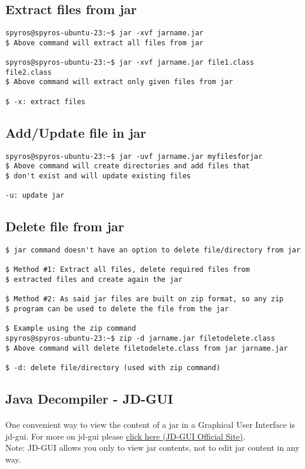 \documentclass{article}
\begin{document}
\subsection{Extract files from jar}
\begin{lstlisting}
spyros@spyros-ubuntu-23:~$ jar -xvf jarname.jar
$ Above command will extract all files from jar

spyros@spyros-ubuntu-23:~$ jar -xvf jarname.jar file1.class file2.class
$ Above command will extract only given files from jar

$ -x: extract files

\end{lstlisting}

\subsection{Add/Update file in jar}
\begin{lstlisting}
spyros@spyros-ubuntu-23:~$ jar -uvf jarname.jar myfilesforjar
$ Above command will create directories and add files that
$ don't exist and will update existing files

-u: update jar
\end{lstlisting}

\subsection{Delete file from jar}
\begin{lstlisting}
$ jar command doesn't have an option to delete file/directory from jar

$ Method #1: Extract all files, delete required files from
$ extracted files and create again the jar

$ Method #2: As said jar files are built on zip format, so any zip
$ program can be used to delete the file from the jar

$ Example using the zip command
spyros@spyros-ubuntu-23:~$ zip -d jarname.jar filetodelete.class
$ Above command will delete filetodelete.class from jar jarname.jar

$ -d: delete file/directory (used with zip command)

\end{lstlisting}

\subsection{Java Decompiler - JD-GUI}
\paragraph{} One convenient way to view the content of a jar in a Graphical User Interface is jd-gui. For more on jd-gui please \href{https://java-decompiler.github.io/}{click here (JD-GUI Official Site)}.\\Note: JD-GUI allows you only to view jar contents, not to edit jar content in any way.
\end{document}
